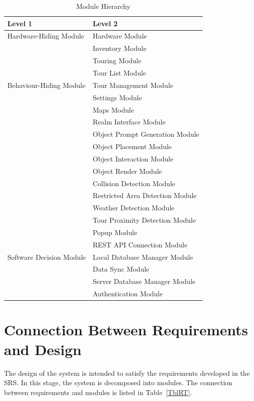 \documentclass[12pt, titlepage]{article}
\begin{document}
\begin{table}[h!]
\centering
\begin{tabular}{p{} p{}}
\toprule
\textbf{Level 1} & \textbf{Level 2}\\
\midrule

{Hardware-Hiding Module} & Hardware Module\\
\midrule

\multirow{7}{0.3\textwidth}{Behaviour-Hiding Module}
& Inventory Module\\
& Touring Module\\
& Tour List Module\\
& Tour Management Module\\
& Settings Module\\
& Maps Module\\
& Realm Interface Module\\
& Object Prompt Generation Module\\
& Object Placement Module\\
& Object Interaction Module\\
& Object Render Module\\
& Collision Detection Module\\
& Restricted Area Detection Module\\
& Weather Detection Module\\
& Tour Proximity Detection Module\\
& Popup Module\\
\midrule

\multirow{3}{0.3\textwidth}{Software Decision Module} & REST API Connection Module\\
& Local Database Manager Module\\
& Data Sync Module\\
& Server Database Manager Module\\
& Authentication Module\\
\bottomrule

\end{tabular}
\caption{Module Hierarchy}
\label{TblMH}
\end{table}

\newpage

\section{Connection Between Requirements and Design} \label{SecConnection}

The design of the system is intended to satisfy the requirements developed in
the SRS. In this stage, the system is decomposed into modules. The connection
between requirements and modules is listed in Table~\ref{TblRT}.
\end{document}
